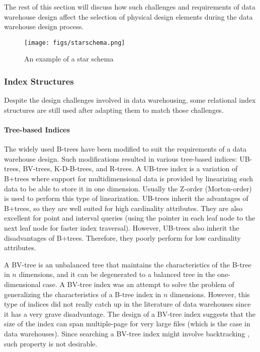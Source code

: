 \documentclass[12pt,a4paper]{article}
\begin{document}
The rest of this section will discuss how such challenges and requirements of data warehouse design affect the selection of physical design elements during the
data warehouse design process.

\begin{figure}[!t]
\centering
\texttt{[image: figs/starschema.png]}
\caption{An example of a star schema}
\label{fig:starschema}
\end{figure}

\subsubsection{Index Structures}
Despite the design challenges involved in data warehousing, some relational index structures are still used after adapting them to match those challenges. 

\paragraph{Tree-based Indices}
The widely used B-trees have been modified to suit the requirements of a data warehouse design. Such modifications resulted in various tree-based indices:
UB-trees, BV-trees, K-D-B-trees, and R-trees. A UB-tree index \cite{bayer1997universal} is a variation of B+trees where support for multidimensional data is
provided by linearizing such data to be able to store it in one dimension. Usually the Z-order (Morton-order) \cite{morton1966computer} is used to perform this
type of linearization. UB-trees inherit the advantages of B+trees, so they are well suited for high cardinality attributes. They are also excellent for point
and interval queries (using the pointer in each leaf node to the next leaf node for faster index traversal). However, UB-trees also inherit the disadvantages of
B+trees. Therefore, they poorly perform for low cardinality attributes.

A BV-tree \cite{freeston1995general} is an unbalanced tree that maintains the characteristics of the B-tree in $n$ dimensions, and it can be degenerated to a
balanced tree in the one-dimensional case. A BV-tree index was an attempt to solve the problem of generalizing the characteristics of a B-tree index in $n$
dimensions. However, this type of indices did not really catch up in the literature of data warehouses since it has a very grave disadvantage. The
design of a BV-tree index suggests that the size of the index can span multiple-page for very large files (which is the case in data warehouses). Since
searching a BV-tree index might involve backtracking \cite{freeston1995general}, such property is not desirable.
\end{document}
